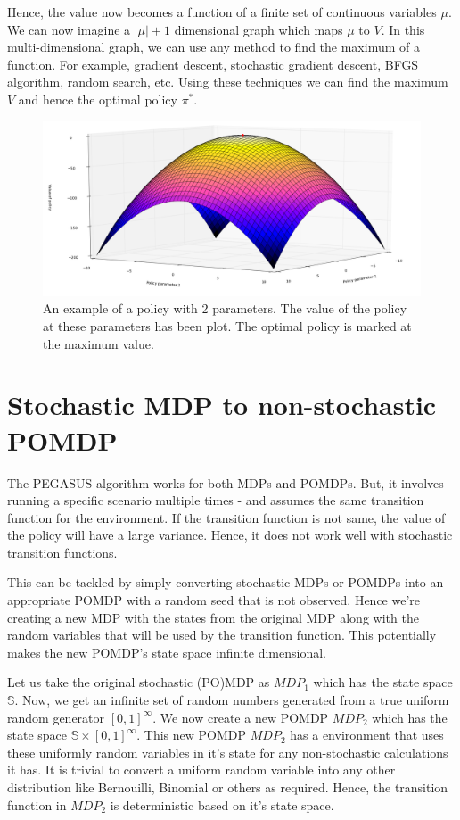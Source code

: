 \documentclass[BTech]{iitmdiss}
\begin{document}
Hence, the value now becomes a function of a finite set of continuous variables $\mu$. We can now imagine a $|\mu|+1$ dimensional graph which maps $\mu$ to $V$. In this multi-dimensional graph, we can use any method to find the maximum of a function. For example, gradient descent, stochastic gradient descent, BFGS algorithm, random search, etc. Using these techniques we can find the maximum $V$ and hence the optimal policy $\pi^{*}$.

\begin{figure}[h]
  \centering
    \includegraphics[width=\textwidth]{gradient_descent.png}
    \caption{An example of a policy with 2 parameters. The value of the policy at these parameters has been plot. The optimal policy is marked at the maximum value.}
\end{figure}

\section{Stochastic MDP to non-stochastic POMDP}

The PEGASUS algorithm works for both MDPs and POMDPs. But, it involves running a specific scenario multiple times - and assumes the same transition function for the environment. If the transition function is not same, the value of the policy will have a large variance. Hence, it does not work well with stochastic transition functions.

This can be tackled by simply converting stochastic MDPs or POMDPs into an appropriate POMDP with a random seed that is not observed. Hence we're creating a new MDP with the states from the original MDP along with the random variables that will be used by the transition function. This potentially makes the new POMDP's state space infinite dimensional.

Let us take the original stochastic (PO)MDP as $MDP_{1}$ which has the state space $\mathbb{S}$. Now, we get an infinite set of random numbers generated from a true uniform random generator $[0,1]^{\infty}$. We now create a new POMDP $MDP_{2}$ which has the state space $\mathbb{S} \times [0,1]^{\infty}$. This new POMDP $MDP_{2}$ has a environment that uses these uniformly random variables in it's state for any non-stochastic calculations it has. It is trivial to convert a uniform random variable into any other distribution like Bernouilli, Binomial or others as required. Hence, the transition function in $MDP_{2}$ is deterministic based on it's state space.
\end{document}
